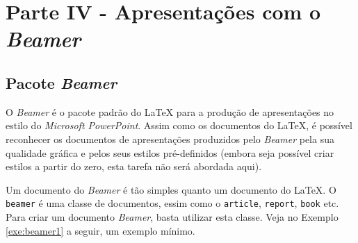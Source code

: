 \chapter{Parte IV - Apresentações com o \textit{Beamer}}
\label{cap:parteIV}

\section{Pacote \textit{Beamer}}
\label{sec:beamer}

O \textit{Beamer} é o pacote padrão do \LaTeX{} para a produção de apresentações no estilo do \textit{Microsoft PowerPoint}. Assim como os documentos do \LaTeX{}, é possível reconhecer os documentos de apresentações produzidos pelo \textit{Beamer} pela sua qualidade gráfica e pelos seus estilos pré-definidos (embora seja possível criar estilos a partir do zero, esta tarefa não será abordada aqui).

Um documento do \textit{Beamer} é tão simples quanto um documento do \LaTeX{}. O {\tt beamer} é uma classe de documentos, essim como o {\tt article}, {\tt report}, {\tt book} etc. Para criar um documento \textit{Beamer}, basta utilizar esta classe. Veja no Exemplo \ref{exe:beamer1} a seguir, um exemplo mínimo.


